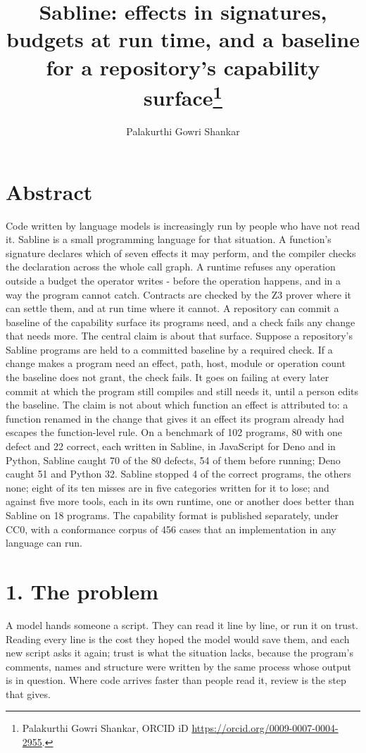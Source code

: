 \documentclass[
]{article}
\title{Sabline: effects in signatures, budgets at run time, and a
baseline for a repository's capability surface\thanks{Palakurthi Gowri
Shankar, ORCID iD \url{https://orcid.org/0009-0007-0004-2955}.}}
\author{Palakurthi Gowri Shankar}
\date{}
\newcounter{none} %
\begin{document}
\maketitle

\section{Abstract}\label{abstract}

Code written by language models is increasingly run by people who have
not read it. Sabline is a small programming language for that situation.
A function's signature declares which of seven effects it may perform,
and the compiler checks the declaration across the whole call graph. A
runtime refuses any operation outside a budget the operator writes -
before the operation happens, and in a way the program cannot catch.
Contracts are checked by the Z3 prover where it can settle them, and at
run time where it cannot. A repository can commit a baseline of the
capability surface its programs need, and a check fails any change that
needs more. The central claim is about that surface. Suppose a
repository's Sabline programs are held to a committed baseline by a
required check. If a change makes a program need an effect, path, host,
module or operation count the baseline does not grant, the check fails.
It goes on failing at every later commit at which the program still
compiles and still needs it, until a person edits the baseline. The
claim is not about which function an effect is attributed to: a function
renamed in the change that gives it an effect its program already had
escapes the function-level rule. On a benchmark of 102 programs, 80 with
one defect and 22 correct, each written in Sabline, in JavaScript for
Deno and in Python, Sabline caught 70 of the 80 defects, 54 of them
before running; Deno caught 51 and Python 32. Sabline stopped 4 of the
correct programs, the others none; eight of its ten misses are in five
categories written for it to lose; and against five more tools, each in
its own runtime, one or another does better than Sabline on 18 programs.
The capability format is published separately, under CC0, with a
conformance corpus of 456 cases that an implementation in any language
can run.

\section{1. The problem}\label{the-problem}

A model hands someone a script. They can read it line by line, or run it
on trust. Reading every line is the cost they hoped the model would save
them, and each new script asks it again; trust is what the situation
lacks, because the program's comments, names and structure were written
by the same process whose output is in question. Where code arrives
faster than people read it, review is the step that gives.
\end{document}
